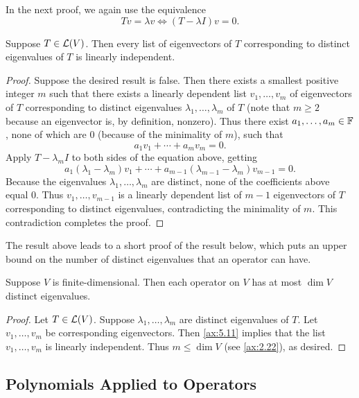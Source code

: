 In the next proof, we again use the equivalence
\[ Tv=\lambda v \iff (T-\lambda I)v=0. \]

\begin{result}\label{ax:5.11}
Suppose $T\in\mathcal{L}(V)$. Then every list of eigenvectors of $T$ corresponding to
distinct eigenvalues of $T$ is linearly independent.
\end{result}

\begin{proof}
Suppose the desired result is false. Then there exists a smallest positive
integer $m$ such that there exists a linearly dependent list $v_1,\dots,v_m$ of
eigenvectors of $T$ corresponding to distinct eigenvalues
$\lambda_1,\dots,\lambda_m$ of $T$ (note that $m\ge2$ because an eigenvector
is, by definition, nonzero). Thus there exist $a_1,\dots,a_m\in\mathbb{F}$, none of
which are $0$ (because of the minimality of $m$), such that
\[ a_1v_1+\cdots+a_mv_m = 0. \]
Apply $T-\lambda_mI$ to both sides of the equation above, getting
\[ a_1(\lambda_1-\lambda_m)v_1+\cdots+a_{m-1}(\lambda_{m-1}-\lambda_m)v_{m-1}
   = 0. \]
Because the eigenvalues $\lambda_1,\dots,\lambda_m$ are distinct, none of the
coefficients above equal $0$. Thus $v_1,\dots,v_{m-1}$ is a linearly dependent
list of $m-1$ eigenvectors of $T$ corresponding to distinct eigenvalues,
contradicting the minimality of $m$. This contradiction completes the proof.
\end{proof}

The result above leads to a short proof of the result below, which puts an
upper bound on the number of distinct eigenvalues that an operator can have.

\begin{result}\label{ax:5.12}
Suppose $V$ is finite-dimensional. Then each operator on $V$ has at most
$\dim V$ distinct eigenvalues.
\end{result}

\begin{proof}
Let $T\in\mathcal{L}(V)$. Suppose $\lambda_1,\dots,\lambda_m$ are distinct eigenvalues
of $T$. Let $v_1,\dots,v_m$ be corresponding eigenvectors. Then \ref{ax:5.11}
implies that the list $v_1,\dots,v_m$ is linearly independent. Thus
$m\le\dim V$ (see \ref{ax:2.22}), as desired.
\end{proof}

\subsection{Polynomials Applied to Operators}

